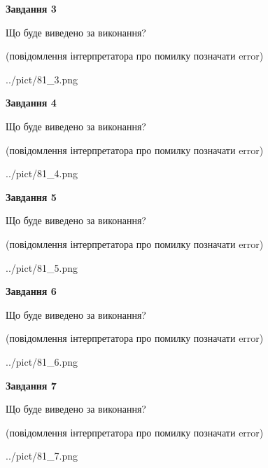 \documentclass[12pt, ukrainian]{article}
\begin{document}
{\begin {large}
{\begin {center}\textbf{Завдання 3}\end {center}}\par
Що буде виведено за виконання?\par
 (повідомлення інтерпретатора про помилку позначати error)\par
\begin{center}
	{../pict/81_3.png}
\end{center}
\newpage

{\begin {center}\textbf{Завдання 4}\end {center}}\par
Що буде виведено за виконання?\par
 (повідомлення інтерпретатора про помилку позначати error)\par
\begin{center}
	{../pict/81_4.png}
\end{center}
\newpage

{\begin {center}\textbf{Завдання 5}\end {center}}\par
Що буде виведено за виконання?\par
 (повідомлення інтерпретатора про помилку позначати error)\par
\begin{center}
	{../pict/81_5.png}
\end{center}
\newpage

{\begin {center}\textbf{Завдання 6}\end {center}}\par
Що буде виведено за виконання?\par
 (повідомлення інтерпретатора про помилку позначати error)\par
\begin{center}
	{../pict/81_6.png}
\end{center}
\newpage

{\begin {center}\textbf{Завдання 7}\end {center}}\par
Що буде виведено за виконання?\par
 (повідомлення інтерпретатора про помилку позначати error)\par
\begin{center}
	{../pict/81_7.png}
\end{center}
\newpage


\end{large}}
\end{document}
